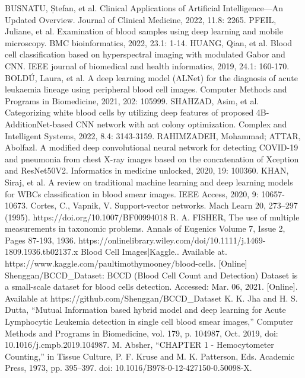 \documentclass[conference]{IEEEtran}
\begin{document}
\begin{thebibliography}{00}
 BUSNATU, Ștefan, et al. Clinical Applications of Artificial Intelligence—An Updated Overview. Journal of Clinical Medicine, 2022, 11.8: 2265.
 PFEIL, Juliane, et al. Examination of blood samples using deep learning and mobile microscopy. BMC bioinformatics, 2022, 23.1: 1-14.
 HUANG, Qian, et al. Blood cell classification based on hyperspectral imaging with modulated Gabor and CNN. IEEE journal of biomedical and health informatics, 2019, 24.1: 160-170.
 BOLDÚ, Laura, et al. A deep learning model (ALNet) for the diagnosis of acute leukaemia lineage using peripheral blood cell images. Computer Methods and Programs in Biomedicine, 2021, 202: 105999.
 SHAHZAD, Asim, et al. Categorizing white blood cells by utilizing deep features of proposed 4B-AdditionNet-based CNN network with ant colony optimization. Complex and Intelligent Systems, 2022, 8.4: 3143-3159.
 RAHIMZADEH, Mohammad; ATTAR, Abolfazl. A modified deep convolutional neural network for detecting COVID-19 and pneumonia from chest X-ray images based on the concatenation of Xception and ResNet50V2. Informatics in medicine unlocked, 2020, 19: 100360.
 KHAN, Siraj, et al. A review on traditional machine learning and deep learning models for WBCs classification in blood smear images. IEEE Access, 2020, 9: 10657-10673.
 Cortes, C., Vapnik, V. Support-vector networks. Mach Learn 20, 273–297 (1995). https://doi.org/10.1007/BF00994018
 R. A. FISHER, The use of multiple measurements in taxonomic problems. Annals of Eugenics Volume 7, Issue 2, Pages 87-193, 1936. https://onlinelibrary.wiley.com/doi/10.1111/j.1469-1809.1936.tb02137.x
 Blood Cell Images|Kaggle.. Available at. https://www.kaggle.com/paultimothymooney/blood-cells. [Online]
 Shenggan/BCCD_Dataset: BCCD (Blood Cell Count and Detection) Dataset is a small-scale dataset for blood cells detection. Accessed: Mar. 06, 2021. [Online]. Available at https://github.com/Shenggan/BCCD_Dataset
 K. K. Jha and H. S. Dutta, “Mutual Information based hybrid model and deep learning for Acute Lymphocytic Leukemia detection in single cell blood smear images,” Computer Methods and Programs in Biomedicine, vol. 179, p. 104987, Oct. 2019, doi: 10.1016/j.cmpb.2019.104987.
 M. Absher, “CHAPTER 1 - Hemocytometer Counting,” in Tissue Culture, P. F. Kruse and M. K. Patterson, Eds. Academic Press, 1973, pp. 395–397. doi: 10.1016/B978-0-12-427150-0.50098-X.

\end{thebibliography}
\end{document}
